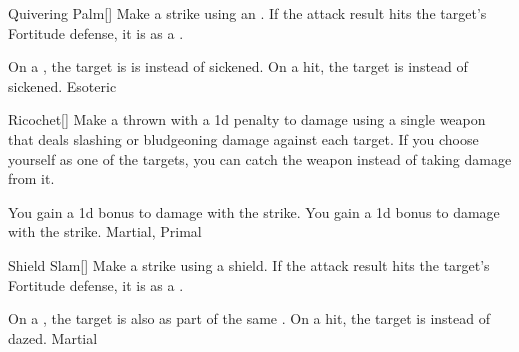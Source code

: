 \lowercase{\hypertarget{maneuver:Quivering Palm}{}}\label{maneuver:Quivering Palm}
\hypertarget{maneuver:Quivering Palm}{}
\begin{freeability}[Rank 3]{Quivering Palm}[]
Make a strike using an .
If the attack result hits the target's Fortitude defense,
it is  as a .

\rankline
{} On a , the target is is  instead of sickened.
 On a hit, the target is  instead of sickened.
 Esoteric
\end{freeability}
\vspace{0.25em}



\lowercase{\hypertarget{maneuver:Ricochet}{}}\label{maneuver:Ricochet}
\hypertarget{maneuver:Ricochet}{}
\begin{freeability}[Rank 3]{Ricochet}[]
Make a thrown  with a \minus1d penalty to damage using a single weapon that deals slashing or bludgeoning damage against each target.
If you choose yourself as one of the targets, you can catch the weapon instead of taking damage from it.

\rankline
{} You gain a \plus1d bonus to damage with the strike.
 You gain a \plus1d bonus to damage with the strike.
 Martial, Primal
\end{freeability}
\vspace{0.25em}



\lowercase{\hypertarget{maneuver:Shield Slam}{}}\label{maneuver:Shield Slam}
\hypertarget{maneuver:Shield Slam}{}
\begin{freeability}[Rank 3]{Shield Slam}[]
Make a strike using a shield.
If the attack result hits the target's Fortitude defense,
it is  as a .

\rankline
{} On a , the target is also  as part of the same .
 On a hit, the target is  instead of dazed.
 Martial
\end{freeability}
\vspace{0.25em}



